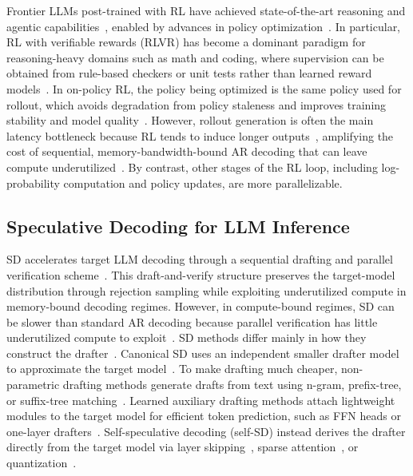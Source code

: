 \documentclass{llmxive}
\providecommand{\Learned}{Learned auxiliary drafting}
\providecommand{\nonparametric}{non-parametric drafting}
\providecommand{\bottleneck}{latency bottleneck}
\begin{document}
Frontier LLMs post-trained with RL have achieved state-of-the-art reasoning and agentic capabilities~\citep{guo2025deepseek,yang2025qwen3,team2025kimi,zeng2025glm}, enabled by advances in policy optimization~\citep{schulman2017proximal,shao2024deepseekmath,yu2025dapo,chen2025minimax}.
In particular, RL with verifiable rewards (RLVR) has become a dominant paradigm for reasoning-heavy domains such as math and coding, where supervision can be obtained from rule-based checkers or unit tests rather than learned reward models~\citep{wen2025reinforcement,guo2025deepseek}.
In on-policy RL, the policy being optimized is the same policy used for rollout, which avoids degradation from policy staleness and improves training stability and model quality~\citep{kumar2025llm,fu2025areal}.
However, rollout generation is often the main \bottleneck{} because RL tends to induce longer outputs~\citep{chen2024not,liu2025understanding}, amplifying the cost of sequential, memory-bandwidth-bound AR decoding that can leave compute underutilized~\citep{gholami2024ai}.
By contrast, other stages of the RL loop, including log-probability computation and policy updates, are more parallelizable.

\subsection{Speculative Decoding for LLM Inference}

SD accelerates target LLM decoding through a sequential drafting and parallel verification scheme~\citep{leviathan2023fast,chen2023accelerating}.
This draft-and-verify structure preserves the target-model distribution through rejection sampling while exploiting underutilized compute in memory-bound decoding regimes.
However, in compute-bound regimes, SD can be slower than standard AR decoding because parallel verification has little underutilized compute to exploit~\citep{sadhukhan2024magicdec}.
SD methods differ mainly in how they construct the drafter~\citep{xia2024unlocking}.
Canonical SD uses an independent smaller drafter model to approximate the target model~\citep{leviathan2023fast,chen2023accelerating}.
To make drafting much cheaper, \nonparametric{} methods generate drafts from text using n-gram, prefix-tree, or suffix-tree matching~\citep{he2024rest,ou2024lossless,stewart2024n}.
\Learned{} methods attach lightweight modules to the target model for efficient token prediction, such as FFN heads or one-layer drafters~\citep{li2024eagle,cai2024medusa}.
Self-speculative decoding (self-SD) instead derives the drafter directly from the target model via layer skipping~\citep{zhang2024draft}, sparse attention~\citep{yue2026specattn}, or quantization~\citep{tiwari2025quantspec}.
\end{document}
